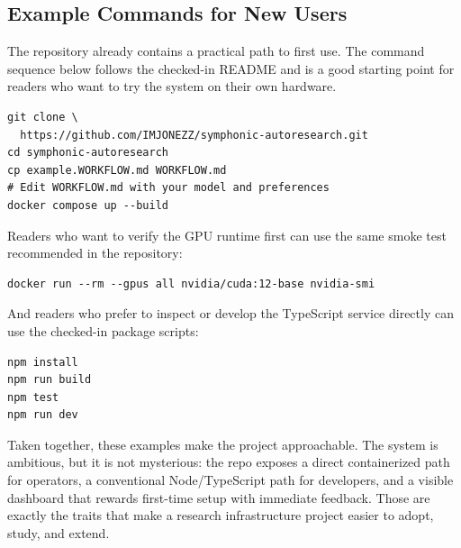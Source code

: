 \documentclass[conference]{IEEEtran}
\begin{document}
\subsection{Example Commands for New Users}
The repository already contains a practical path to first use. The command sequence below follows the checked-in README and is a good starting point for readers who want to try the system on their own hardware.

\begin{lstlisting}[style=appendixshell]
git clone \
  https://github.com/IMJONEZZ/symphonic-autoresearch.git
cd symphonic-autoresearch
cp example.WORKFLOW.md WORKFLOW.md
# Edit WORKFLOW.md with your model and preferences
docker compose up --build
\end{lstlisting}

Readers who want to verify the GPU runtime first can use the same smoke test recommended in the repository:

\begin{lstlisting}[style=appendixshell]
docker run --rm --gpus all nvidia/cuda:12-base nvidia-smi
\end{lstlisting}

And readers who prefer to inspect or develop the TypeScript service directly can use the checked-in package scripts:

\begin{lstlisting}[style=appendixshell]
npm install
npm run build
npm test
npm run dev
\end{lstlisting}

Taken together, these examples make the project approachable. The system is ambitious, but it is not mysterious: the repo exposes a direct containerized path for operators, a conventional Node/TypeScript path for developers, and a visible dashboard that rewards first-time setup with immediate feedback. Those are exactly the traits that make a research infrastructure project easier to adopt, study, and extend.
\end{document}
